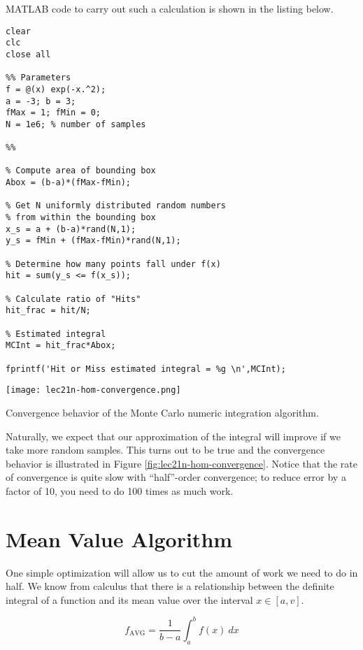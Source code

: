 MATLAB code to carry out such a calculation is shown in the listing below.

\begin{lstlisting}[style=myMatlab,name=lec21-ex1]
clear
clc
close all

%% Parameters
f = @(x) exp(-x.^2);
a = -3; b = 3;
fMax = 1; fMin = 0;
N = 1e6; % number of samples

%%

% Compute area of bounding box
Abox = (b-a)*(fMax-fMin); 

% Get N uniformly distributed random numbers
% from within the bounding box
x_s = a + (b-a)*rand(N,1);
y_s = fMin + (fMax-fMin)*rand(N,1);

% Determine how many points fall under f(x)
hit = sum(y_s <= f(x_s));

% Calculate ratio of "Hits"
hit_frac = hit/N;

% Estimated integral
MCInt = hit_frac*Abox;

fprintf('Hit or Miss estimated integral = %g \n',MCInt);
\end{lstlisting}

\begin{marginfigure}
\texttt{[image: lec21n-hom-convergence.png]}
\caption{Convergence behavior of the Monte Carlo numeric integration algorithm.}
\label{fig:lec21n-hom-convergence}
\end{marginfigure}

Naturally, we expect that our approximation of the integral will improve if we take more random samples.  This turns out to be true and the convergence behavior is illustrated in Figure \ref{fig:lec21n-hom-convergence}.  Notice that the rate of convergence is quite slow with ``half''-order convergence; to reduce error by a factor of 10, you need to do 100 times as much work. 

\section{Mean Value Algorithm}
One simple optimization will allow us to cut the amount of work we need to do in half.  We know from calculus that there is a relationship between the definite integral of a function and its mean value over the interval $x \in [a,v]$.

\begin{equation}
f_{\text{AVG}} = \frac{1}{b-a}\int_{a}^{b} f(x) \ dx
\label{eq:lec21n-mean-value-thm}
\end{equation}

